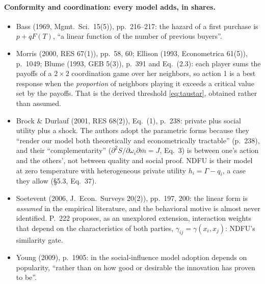 \documentclass[11pt,a4paper]{article}
\begin{document}
\paragraph{Conformity and coordination: every model adds, in shares.}
\begin{itemize}
  \item Bass (1969, Mgmt.\ Sci.\ 15(5)), pp.~216--217: the hazard of a first purchase is
    $p + q F(T)$, ``a linear function of the number of previous buyers''.
  \item Morris (2000, RES 67(1)), pp.~58, 60; Ellison (1993, Econometrica 61(5)), p.~1049;
    Blume (1993, GEB 5(3)), p.~391 and Eq.~(2.3): each player sums the payoffs of a
    $2\times2$ coordination game over her neighbors, so action 1 is a best response when the
    \emph{proportion} of neighbors playing it exceeds a critical value set by the payoffs.
    That is the derived threshold \eqref{eq:taustar}, obtained rather than assumed.
  \item Brock \& Durlauf (2001, RES 68(2)), Eq.~(1), p.~238: private plus social utility
    plus a shock. The authors adopt the parametric forms because they ``render our model
    both theoretically and econometrically tractable'' (p.~238), and their
    ``complementarity'' ($\partial^2 S/\partial\omega_i\partial\bar m = J$, Eq.~3) is between
    one's action and the others', not between quality and social proof. NDFU is their
    model at zero temperature with heterogeneous private utility $h_i = \Gamma - q_i$, a
    case they allow (\S5.3, Eq.~37).
  \item Soetevent (2006, J.\ Econ.\ Surveys 20(2)), pp.~197, 200: the linear form is
    \emph{assumed} in the empirical literature, and the behavioral motive is almost never
    identified. P.~222 proposes, as an unexplored extension, interaction weights that depend
    on the characteristics of both parties, $\gamma_{ij} = \gamma(x_i, x_j)$: NDFU's
    similarity gate.
  \item Young (2009), p.~1905: in the social-influence model adoption depends on
    popularity, ``rather than on how good or desirable the innovation has proven to be''.
\end{itemize}
\end{document}
